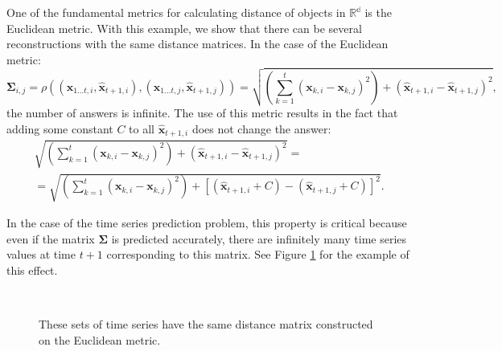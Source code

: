 \documentclass[12pt]{article}
\begin{document}
One of the fundamental metrics for calculating distance of objects in $\mathbb{R^d}$ is the Euclidean metric. With this example, we show that there can be several reconstructions with the same distance matrices. In the case of the Euclidean metric:
\[\mathbf{\Sigma}_{i,j} = \rho((\mathbf{x}_{1 \ldots t, i}, \hat{\mathbf{x}}_{t+1, i}), (\mathbf{x}_{1 \ldots t, j}, \hat{\mathbf{x}}_{t+1, j}))=\sqrt{\left(\sum_{k=1}^t (\mathbf{x}_{k,i}-\mathbf{x}_{k,j})^2\right) + (\hat{\mathbf{x}}_{t+1, i}-\hat{\mathbf{x}}_{t+1, j})^2},\]
the number of answers is infinite.
The use of this metric results in the fact that adding some constant $C$ to all $\hat{\mathbf{x}}_{t+1, i}$ does not change the answer:
\begin{gather*}
	\sqrt{\left(\sum_{k=1}^t (\mathbf{x}_{k,i}-\mathbf{x}_{k,j})^2\right) + (\hat{\mathbf{x}}_{t+1, i}-\hat{\mathbf{x}}_{t+1, j})^2} =\\
	= \sqrt{\left(\sum_{k=1}^t (\mathbf{x}_{k,i}-\mathbf{x}_{k,j})^2\right) + [(\hat{\mathbf{x}}_{t+1, i} + C) -(\hat{\mathbf{x}}_{t+1, j} + C)]^2}.
\end{gather*}

In the case of the time series prediction problem, this property is critical because even if the matrix $\mathbf{\Sigma}$ is predicted accurately, there are infinitely many time series values at time $t+1$ corresponding to this matrix. See Figure \ref{fig:fig1} for the example of this effect.
\begin{figure}[!htbp]
	\centering
	\\
	\caption{These sets of time series have the same distance matrix constructed on the Euclidean metric.}
	\label{fig:fig1}
\end{figure}
\end{document}
